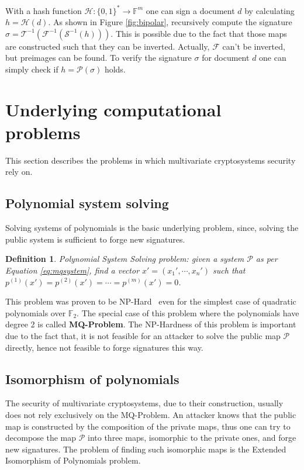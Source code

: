 \documentclass{ufsctex/ufsctex}
\newtheorem{definition}{Definition}
\begin{document}
With a hash function $\mathcal{H}:\{0,1\}^* \to \mathbb{F}^m$ one can sign a
document $d$ by calculating $h = \mathcal{H}(d)$. As shown in Figure
\ref{fig:bipolar}, recursively compute the signature $\sigma =
\mathcal{T}^{-1}(\mathcal{F}^{-1}(\mathcal{S}^{-1}(h)))$. This is possible due
to the fact that those maps are constructed such that they can be inverted.
Actually, $\mathcal{F}$ can't be inverted, but preimages can be found. To
verify the signature $\sigma$ for document $d$ one can simply check if $h =
\mathcal{P}(\sigma)$ holds.

\section{Underlying computational problems}\label{sec:problems}

This section describes the problems in which multivariate cryptosystems
security rely on.

\subsection{Polynomial system solving}\label{sec:posso}

Solving systems of polynomials is the basic underlying problem, since, solving
the public system is sufficient to forge new signatures.

\begin{definition}
Polynomial System Solving problem: given a system $\mathcal{P}$ as per Equation
\ref{eq:mqsystem}, find a vector $x' = (x_1',\cdots,x_n')$ such that
$p^{(1)}(x') = p^{(2)}(x') = \cdots = p^{(m)}(x') = 0$.
\end{definition}

This problem was proven to be NP-Hard~\cite[Appendix A7.2]{garey1979npc} even
for the simplest case of quadratic polynomials over $\mathbb{F}_2$. The special
case of this problem where the polynomials have degree 2 is called
\textbf{MQ-Problem}. The NP-Hardness of this problem is important due to the
fact that, it is not feasible for an attacker to solve the public map
$\mathcal{P}$ directly, hence not feasible to forge signatures this way.

\subsection{Isomorphism of polynomials}

The security of multivariate cryptosystems, due to their construction, usually
does not rely exclusively on the MQ-Problem. An attacker knows that the public
map is constructed by the composition of the private maps, thus one can try to
decompose the map $\mathcal{P}$ into three maps, isomorphic to the private
ones, and forge new signatures. The problem of finding such isomorphic maps is
the Extended Isomorphism of Polynomials problem.
\end{document}

